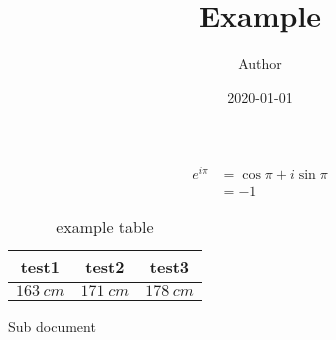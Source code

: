 \documentclass[a4paper,11pt,xelatex,ja=standard]{bxjsarticle}
\title{Example}
\author{Author}
\date{2020-01-01}
\begin{document}
\maketitle
\begin{align}
e^{i\pi} &= \cos{\pi} + i\sin{\pi}\\
&=-1
\end{align}
\begin{table}[hbtp]
\centering
\caption{example table}
\begin{tabular}{ccc}
\hline
test1 & test2 & test3 \\
\hline \hline
$\SI{163}{cm}$ & $\SI{171}{cm}$ & $\SI{178}{cm}$ \\
\hline
\end{tabular}
\end{table}
\textrm{Sub document}
\end{document}
